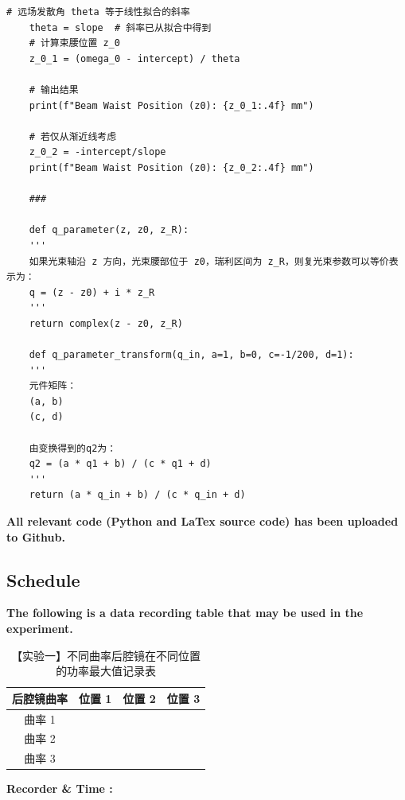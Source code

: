 \begin{lstlisting}[style=pythonstyle,caption=其它计算代码]
	# 远场发散角 theta 等于线性拟合的斜率
	theta = slope  # 斜率已从拟合中得到
	# 计算束腰位置 z_0
	z_0_1 = (omega_0 - intercept) / theta
	
	# 输出结果
	print(f"Beam Waist Position (z0): {z_0_1:.4f} mm")
	
	# 若仅从渐近线考虑
	z_0_2 = -intercept/slope
	print(f"Beam Waist Position (z0): {z_0_2:.4f} mm")
	
	###
	
	def q_parameter(z, z0, z_R):
	'''
	如果光束轴沿 z 方向，光束腰部位于 z0，瑞利区间为 z_R，则复光束参数可以等价表示为：
	q = (z - z0) + i * z_R
	'''
	return complex(z - z0, z_R)
	
	def q_parameter_transform(q_in, a=1, b=0, c=-1/200, d=1):
	'''
	元件矩阵：
	(a, b)
	(c, d)
	
	由变换得到的q2为：
	q2 = (a * q1 + b) / (c * q1 + d)
	'''
	return (a * q_in + b) / (c * q_in + d)
\end{lstlisting}

\textbf{All relevant code (Python and LaTex source code) has been uploaded to Github.}


\clearpage
\subsection{Schedule}

\textbf{The following is a data recording table that may be used in the experiment.}

\begin{table}[h!]
	\centering
	\caption{【实验一】不同曲率后腔镜在不同位置的功率最大值记录表}
	\begin{tabular}{@{}cccc@{}}
		\toprule
		\textbf{后腔镜曲率} & \textbf{位置 1} & \textbf{位置 2} & \textbf{位置 3} \\ \midrule
		曲率 1 & \makebox[3cm][c]{\rule{0pt}{2ex}} & \makebox[3cm][c]{\rule{0pt}{2ex}} & \makebox[3cm][c]{\rule{0pt}{2ex}} \\ \hline
		曲率 2 & \makebox[3cm][c]{\rule{0pt}{2ex}} & \makebox[3cm][c]{\rule{0pt}{2ex}} & \makebox[3cm][c]{\rule{0pt}{2ex}} \\ \hline
		曲率 3 & \makebox[3cm][c]{\rule{0pt}{2ex}} & \makebox[3cm][c]{\rule{0pt}{2ex}} & \makebox[3cm][c]{\rule{0pt}{2ex}} \\ \bottomrule
	\end{tabular}
\end{table}

\textbf{Recorder \& Time :}

